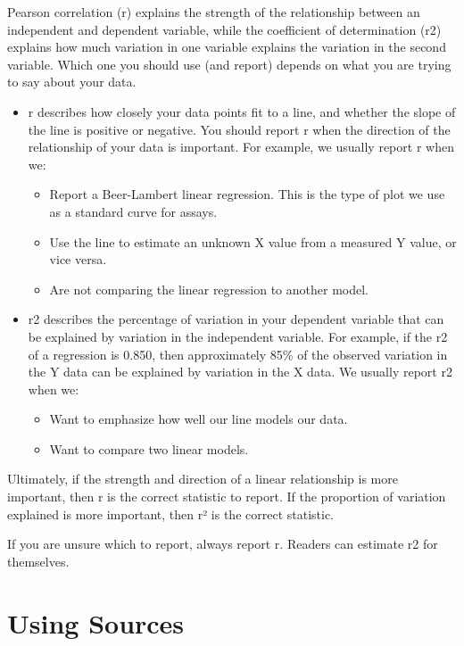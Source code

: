 \documentclass[
]{book}
\providecommand{\tightlist}{%
  \setlength{\itemsep}{0pt}\setlength{\parskip}{0pt}}
\begin{document}
Pearson correlation (r) explains the strength of the relationship between an independent and dependent variable, while the coefficient of determination (r2) explains how much variation in one variable explains the variation in the second variable. Which one you should use (and report) depends on what you are trying to say about your data.

\begin{itemize}
\tightlist
\item
  r describes how closely your data points fit to a line, and whether the slope of the line is positive or negative. You should report r when the direction of the relationship of your data is important. For example, we usually report r when we:

  \begin{itemize}
  \tightlist
  \item
    Report a Beer-Lambert linear regression. This is the type of plot we use as a standard curve for assays.
  \item
    Use the line to estimate an unknown X value from a measured Y value, or vice versa.
  \item
    Are not comparing the linear regression to another model.
  \end{itemize}
\item
  r2 describes the percentage of variation in your dependent variable that can be explained by variation in the independent variable. For example, if the r2 of a regression is 0.850, then approximately 85\% of the observed variation in the Y data can be explained by variation in the X data. We usually report r2 when we:

  \begin{itemize}
  \tightlist
  \item
    Want to emphasize how well our line models our data.
  \item
    Want to compare two linear models.
  \end{itemize}
\end{itemize}

Ultimately, if the strength and direction of a linear relationship is more important, then r is the correct statistic to report. If the proportion of variation explained is more important, then r² is the correct statistic.

If you are unsure which to report, always report r. Readers can estimate r2 for themselves.

\hypertarget{part-using-sources}{%
\part{Using Sources}\label{part-using-sources}}
\end{document}
